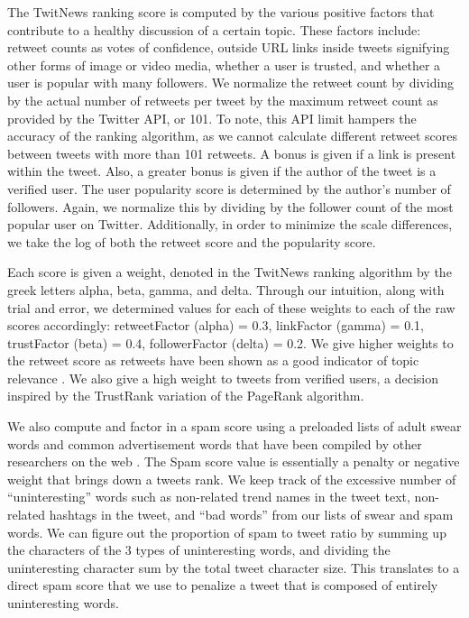\documentclass[10pt]{proc}
\begin{document}
  The TwitNews ranking score is computed by the various positive factors that contribute to a healthy discussion of a certain topic.  These factors include: retweet counts as votes of confidence, outside URL links inside tweets signifying other forms of image or video media, whether a user is trusted, and whether a user is popular with many followers.  We normalize the retweet count by dividing by the actual number of retweets per tweet by the maximum retweet count as provided by the Twitter API, or 101. To note, this API limit hampers the accuracy of the ranking algorithm, as we cannot calculate different retweet scores between tweets with more than 101 retweets.  A bonus is given if a link is present within the tweet.  Also, a greater bonus is given if the author of the tweet is a verified user.  The user popularity score is determined by the author's number of followers. Again, we normalize this by dividing by the follower count of the most popular user on Twitter. Additionally, in order to minimize the scale differences, we take the log of both the retweet score and the popularity score.

  Each score is given a weight, denoted in the TwitNews ranking algorithm by the greek letters alpha, beta, gamma, and delta. Through our intuition, along with trial and error, we determined values for each of these weights to each of the raw scores accordingly: retweetFactor (alpha) = 0.3, linkFactor (gamma) = 0.1, trustFactor (beta) = 0.4, followerFactor (delta) = 0.2.  We give higher weights to the retweet score as retweets have been shown as a good indicator of topic relevance \cite{Twitter_semantics}. We also give a high weight to tweets from verified users, a decision inspired by the TrustRank \cite{trust_rank} variation of the PageRank \cite{page_rank} algorithm.

  We also compute and factor in a spam score using a preloaded lists of adult swear words and common advertisement words that have been compiled by other researchers on the web \cite{swear_words} \cite{bad_words}.  The Spam score value is essentially a penalty or negative weight that brings down a tweets rank.  We keep track of the excessive number of ``uninteresting'' words such as non-related trend names in the tweet text, non-related hashtags in the tweet, and ``bad words'' from our lists of swear and spam words.  We can figure out the proportion of spam to tweet ratio by summing up the characters of the 3 types of uninteresting words, and dividing the uninteresting character sum by the total tweet character size.  This translates to a direct spam score that we use to penalize a tweet that is composed of entirely uninteresting words.
\end{document}
